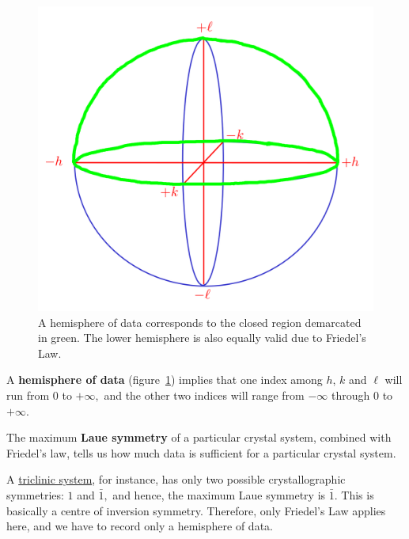 \begin{figure}
	\centering
	\includegraphics[scale=0.15]{hemisphere_data.png}
	\caption{\label{fig:hemisphere}A hemisphere of data corresponds to the closed region demarcated in green. The lower hemisphere is also equally valid due to Friedel's Law.}
\end{figure}
	
A \textbf{hemisphere of data} (figure~\ref{fig:hemisphere}) implies that one index among $h$, $k$ and $\ell$ will run from $0$ to $+\infty,$ and the other two indices will range from $-\infty$ through $0$ to $+\infty.$
	
The maximum \textbf{Laue symmetry} of a particular crystal system, combined with Friedel's law, tells us how much data is sufficient for a particular crystal system.

A \ul{triclinic system}, for instance, has only two possible crystallographic symmetries: $1$ and $\bar{1},$ and hence, the maximum Laue symmetry is $\bar{1}.$  This is basically a centre of inversion symmetry. Therefore, only Friedel's Law applies here, and we have to record only a hemisphere of data.

